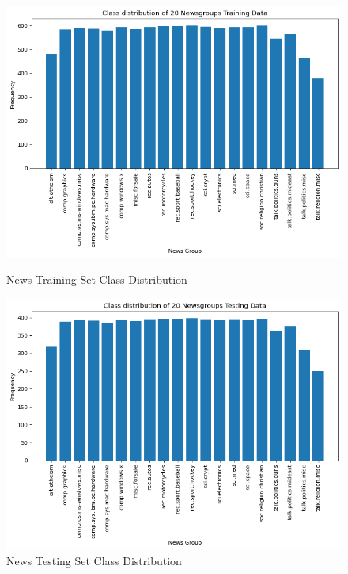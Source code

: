 \documentclass{homework}
\begin{document}
\begin{figure}[h!]
  \centering
  \begin{minipage}[h]{0.3\textwidth}
    \includegraphics[width=\textwidth]{news-class-distribution-training.png}
    \caption{News Training Set Class Distribution}\label{news-group-training-class-distribution}
  \end{minipage}
\hspace{1.5cm}
    \begin{minipage}[h]{0.3\textwidth}
    \includegraphics[width=\textwidth]{news-class-distribution-testing.png}
    \caption{News Testing Set Class Distribution}\label{news-group-testing-class-distribution}
  \end{minipage}
\end{figure}
\end{document}
